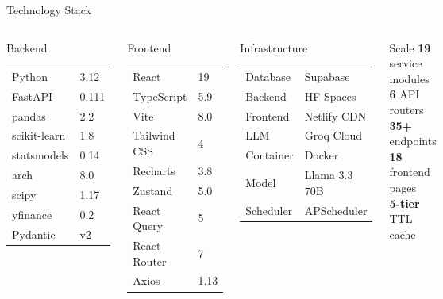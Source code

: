 \documentclass[aspectratio=169, 11pt]{beamer}
\begin{document}
\begin{frame}{Technology Stack}
\begin{columns}[T]
\begin{block}{Backend}
\footnotesize
\renewcommand{\arraystretch}{1.15}
\begin{tabular}{@{}ll@{}}
  Python & 3.12 \\
  FastAPI & 0.111 \\
  pandas & 2.2 \\
  scikit-learn & 1.8 \\
  statsmodels & 0.14 \\
  arch & 8.0 \\
  scipy & 1.17 \\
  yfinance & 0.2 \\
  Pydantic & v2 \\
\end{tabular}
\end{block}

\begin{block}{Frontend}
\footnotesize
\renewcommand{\arraystretch}{1.15}
\begin{tabular}{@{}ll@{}}
  React & 19 \\
  TypeScript & 5.9 \\
  Vite & 8.0 \\
  Tailwind CSS & 4 \\
  Recharts & 3.8 \\
  Zustand & 5.0 \\
  React Query & 5 \\
  React Router & 7 \\
  Axios & 1.13 \\
\end{tabular}
\end{block}

\begin{block}{Infrastructure}
\footnotesize
\renewcommand{\arraystretch}{1.15}
\begin{tabular}{@{}ll@{}}
  Database & Supabase \\
  Backend & HF Spaces \\
  Frontend & Netlify CDN \\
  LLM & Groq Cloud \\
  Container & Docker \\
  Model & Llama 3.3 70B \\
  Scheduler & APScheduler \\
\end{tabular}
\end{block}

\vspace{0.15cm}
\begin{exampleblock}{Scale}
\footnotesize
\textbf{19} service modules\\
\textbf{6} API routers\\
\textbf{35+} endpoints\\
\textbf{18} frontend pages\\
\textbf{5-tier} TTL cache
\end{exampleblock}
\end{columns}
\end{frame}
\end{document}
